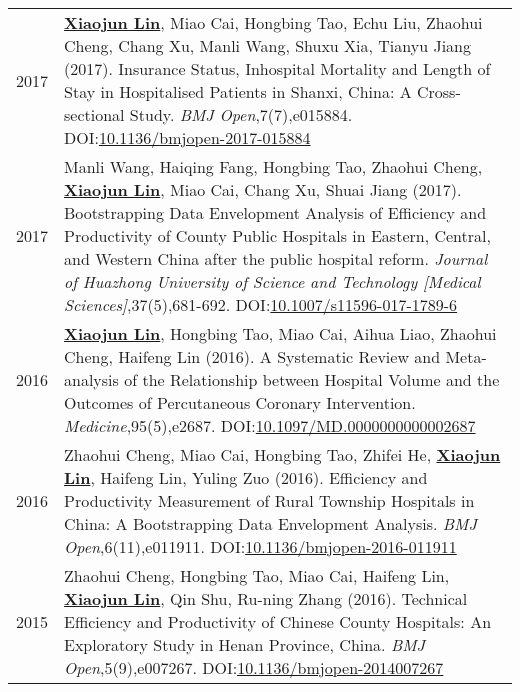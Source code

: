 \documentclass[a4paper,10pt]{article}
\begin{document}
\begin{longtable}{r p{13cm}}
2017 &  \underline{\textbf{Xiaojun Lin}}, Miao Cai, Hongbing Tao, Echu Liu, Zhaohui Cheng, Chang Xu, Manli Wang, Shuxu Xia, Tianyu Jiang (2017). Insurance Status, Inhospital Mortality and Length of Stay in Hospitalised Patients in Shanxi, China: A Cross-sectional Study. \emph{BMJ Open},7(7),e015884. DOI:\href{https://doi.org/10.1136/bmjopen-2017-015884}{10.1136/bmjopen-2017-015884}\\[5pt]

2017 & Manli Wang, Haiqing Fang, Hongbing Tao, Zhaohui Cheng, \underline{\textbf{Xiaojun Lin}}, Miao Cai, Chang Xu, Shuai Jiang (2017). Bootstrapping Data Envelopment Analysis of Efficiency and Productivity of County Public Hospitals in Eastern, Central, and Western China after the public hospital reform. \emph{Journal of Huazhong University of Science and Technology [Medical Sciences]},37(5),681-692. DOI:\href{https://doi.org/10.1007/s11596-017-1789-6}{10.1007/s11596-017-1789-6}\\[5pt]

2016 &  \underline{\textbf{Xiaojun Lin}}, Hongbing Tao, Miao Cai, Aihua Liao, Zhaohui Cheng, Haifeng Lin (2016). A Systematic Review and Meta-analysis of the Relationship between Hospital Volume and the Outcomes of Percutaneous Coronary Intervention.  \emph{Medicine},95(5),e2687. DOI:\href{https://doi.org/10.1097/MD.0000000000002687}{10.1097/MD.0000000000002687}\\[5pt]

2016 &  Zhaohui Cheng, Miao Cai, Hongbing Tao, Zhifei He, \underline{\textbf{Xiaojun Lin}}, Haifeng Lin, Yuling Zuo (2016). Efficiency and Productivity Measurement of Rural Township Hospitals in China: A Bootstrapping Data Envelopment Analysis. \emph{BMJ Open},6(11),e011911. DOI:\href{https://doi.org/10.1136/bmjopen-2016-011911}{10.1136/bmjopen-2016-011911}\\[5pt]

2015 & Zhaohui Cheng, Hongbing Tao, Miao Cai, Haifeng Lin, \underline{\textbf{Xiaojun Lin}}, Qin Shu, Ru-ning Zhang (2016). Technical Efficiency and Productivity of Chinese County Hospitals: An Exploratory Study in Henan Province, China. \emph{BMJ Open},5(9),e007267. DOI:\href{https://doi.org/10.1136/bmjopen-2014007267}{10.1136/bmjopen-2014007267}\\[5pt] 
\end{longtable}
\end{document}
